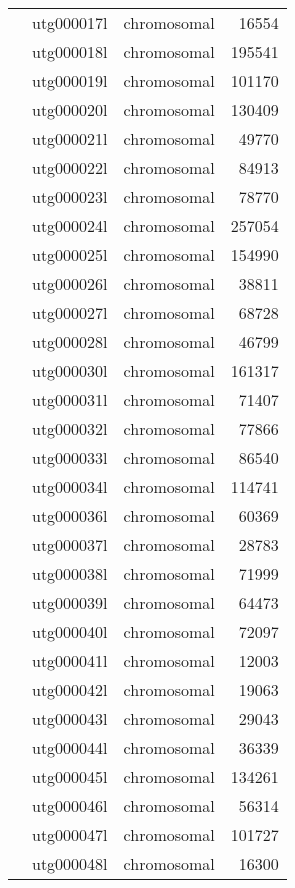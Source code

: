 {\begin{supertabular}{llcr}
          & utg000017l & chromosomal & 16554 \\
          & utg000018l & chromosomal & 195541 \\
          & utg000019l & chromosomal & 101170 \\
          & utg000020l & chromosomal & 130409 \\
          & utg000021l & chromosomal & 49770 \\
          & utg000022l & chromosomal & 84913 \\
          & utg000023l & chromosomal & 78770 \\
          & utg000024l & chromosomal & 257054 \\
          & utg000025l & chromosomal & 154990 \\
          & utg000026l & chromosomal & 38811 \\
          & utg000027l & chromosomal & 68728 \\
          & utg000028l & chromosomal & 46799 \\
          & utg000030l & chromosomal & 161317 \\
          & utg000031l & chromosomal & 71407 \\
          & utg000032l & chromosomal & 77866 \\
          & utg000033l & chromosomal & 86540 \\
          & utg000034l & chromosomal & 114741 \\
          & utg000036l & chromosomal & 60369 \\
          & utg000037l & chromosomal & 28783 \\
          & utg000038l & chromosomal & 71999 \\
          & utg000039l & chromosomal & 64473 \\
          & utg000040l & chromosomal & 72097 \\
          & utg000041l & chromosomal & 12003 \\
          & utg000042l & chromosomal & 19063 \\
          & utg000043l & chromosomal & 29043 \\
          & utg000044l & chromosomal & 36339 \\
          & utg000045l & chromosomal & 134261 \\
          & utg000046l & chromosomal & 56314 \\
          & utg000047l & chromosomal & 101727 \\
          & utg000048l & chromosomal & 16300 \\

\end{supertabular}}
